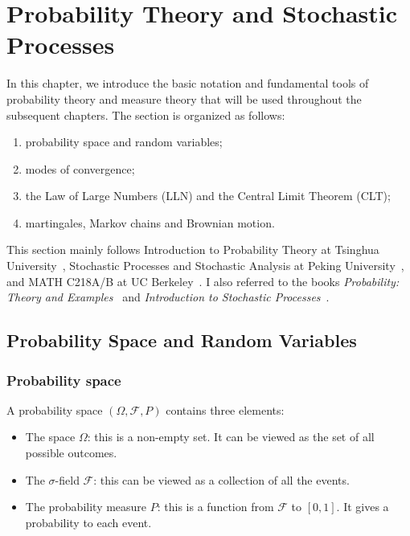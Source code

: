 \newpage
\section{Probability Theory and Stochastic Processes}
In this chapter, we introduce the basic notation and fundamental tools of probability theory and measure theory that will be used throughout the subsequent chapters. The section is organized as follows: 
\begin{enumerate}
    \item probability space and random variables;
    \item modes of convergence;
    \item the Law of Large Numbers (LLN) and the Central Limit Theorem (CLT);
    \item martingales, Markov chains and Brownian motion. 
\end{enumerate}

This section mainly follows Introduction to Probability Theory at Tsinghua University~\cite{tsinghuaProbability}, Stochastic Processes and Stochastic Analysis at Peking University~\cite{pkuStochasticProcesses,pkuStochasticAnalysis}, and MATH C218A/B at UC Berkeley~\cite{chewiBerkeleyMathC218A,berkeleyMathC218B}. I also referred to the books \emph{Probability: Theory and Examples}~\cite{durrett2019probability} and \emph{Introduction to Stochastic Processes}~\cite{lawler2018introduction}.

\subsection{Probability Space and Random Variables}
\subsubsection{Probability space}
A probability space \( (\Omega, \mathcal{F}, P) \) contains three elements:
\begin{itemize}
    \item The space \(\Omega\): this is a non-empty set. It can be viewed as the set of all possible outcomes.
    \item The \(\sigma\)-field \(\mathcal{F}\): this can be viewed as a collection of all the events.
    \item The probability measure \(P\): this is a function from \(\mathcal{F}\) to \([0, 1]\). It gives a probability to each event.
\end{itemize}

